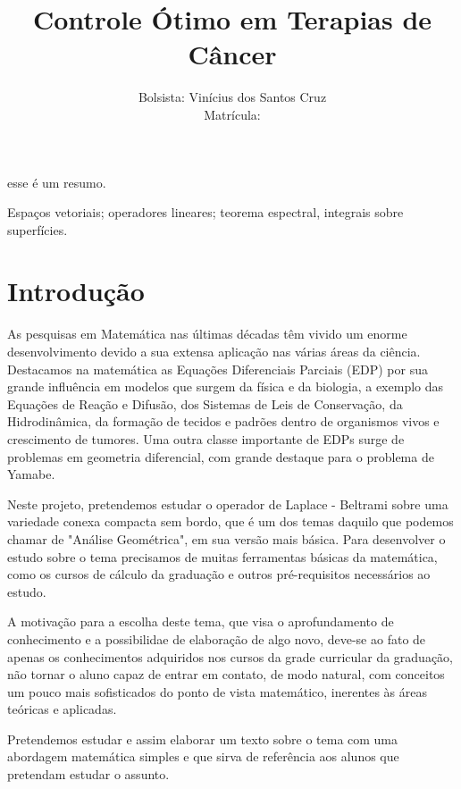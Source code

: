 \documentclass{ufpethesis}
\institute{Pró-Reitoria de Pós-Graduação e Pesquisa}
\title{Controle Ótimo em Terapias de Câncer}
\date{}
\author{Bolsista: Vinícius dos Santos Cruz\\
Matrícula: }
\begin{document}
\frontmatter

\frontpage

\resumo
esse é um resumo.
\begin{keywords}
Espaços vetoriais; operadores lineares; teorema espectral, integrais sobre superfícies.
\end{keywords}

\tableofcontents

\mainmatter

\chapter{Introdução}

As pesquisas em Matemática nas \'{u}ltimas d\'{e}cadas t\^{e}m vivido um enorme desenvolvimento devido a sua extensa aplicação nas v\'{a}rias \'{a}reas da ci\^{e}ncia. Destacamos na matem\'{a}tica as Equações Diferenciais Parciais (EDP) por sua grande influência em modelos que surgem da física e da biologia, a exemplo das Equações de Reação e Difusão, dos Sistemas de Leis de Conservação, da Hidrodinâmica, da formação de tecidos e padrões dentro de organismos vivos e crescimento de tumores. Uma outra classe importante de EDPs surge de problemas em geometria diferencial, com grande destaque para o problema de Yamabe.

Neste projeto, pretendemos estudar o operador de Laplace - Beltrami sobre uma variedade conexa compacta sem bordo, que é um dos temas daquilo que podemos chamar de "Análise Geométrica", em sua versão mais básica. Para desenvolver o estudo sobre o tema precisamos de muitas ferramentas básicas da matemática, como os cursos de cálculo da graduação e outros pré-requisitos necessários ao estudo.

A motivação para a escolha deste tema, que visa o aprofundamento de conhecimento e a possibilidae de elaboração de algo novo, deve-se ao fato de apenas os conhecimentos adquiridos nos cursos da grade curricular da graduação, não tornar o aluno capaz de entrar em contato, de modo natural, com conceitos um pouco mais sofisticados do ponto de vista matemático, inerentes às áreas teóricas e aplicadas.

Pretendemos estudar e assim elaborar um texto sobre o tema com uma abordagem matemática simples e que sirva de referência aos alunos que pretendam estudar o assunto.
\end{document}
